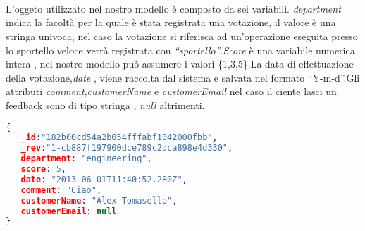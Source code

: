 \\\\\\L'oggeto utilizzato nel nostro modello è composto da sei variabili.
\emph{department} indica la facoltà per la quale è stata registrata una
votazione, il valore è una stringa univoca, nel caso la votazione si
riferisca ad un'operazione eseguita presso lo sportello veloce verrà registrata
con \emph{``sportello''}.\emph{Score} è una variabile numerica intera , nel
nostro modello può assumere i valori \{1,3,5\}.La data di effettuazione della
votazione,\emph{date} , viene raccolta dal sistema e salvata nel formato
``Y-m-d''.Gli attributi \emph{comment},\emph{customerName} e
\emph{customerEmail} nel caso il ciente lasci un feedback sono di tipo stringa , \emph{null} altrimenti. 
\\
\begin{lstlisting}[language=json] 
{ 
   _id:"182b00cd54a2b054fffabf1042000fbb", 
   _rev:"1-cb887f197900dce789c2dca898e4d330", 
   department: "engineering",
   score: 5,
   date: "2013-06-01T11:40:52.280Z",
   comment: "Ciao",
   customerName: "Alex Tomasello",
   customerEmail: null
}
\end{lstlisting} 
